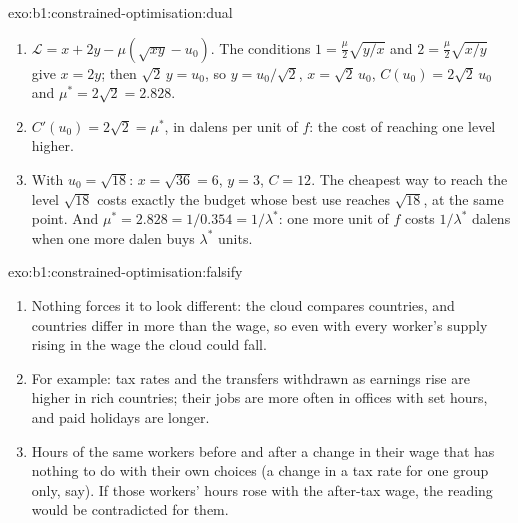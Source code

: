 \begin{solution}{exo:b1:constrained-optimisation:dual}
\begin{enumerate}
  \item $\mathcal L = x + 2y - \mu(\sqrt{xy} - u_0)$. The conditions
    $1 = \tfrac{\mu}{2}\sqrt{y/x}$ and $2 = \tfrac{\mu}{2}\sqrt{x/y}$ give
    $x = 2y$; then $\sqrt{2}\,y = u_0$, so $y = u_0/\sqrt 2$,
    $x = \sqrt 2\, u_0$, $C(u_0) = 2\sqrt 2\, u_0$ and $\mu^* = 2\sqrt 2 = 2.828$.
  \item $C'(u_0) = 2\sqrt2 = \mu^*$, in dalens per unit of $f$: the cost of
    reaching one level higher.
  \item With $u_0 = \sqrt{18}$: $x = \sqrt{36} = 6$, $y = 3$, $C = 12$. The
    cheapest way to reach the level $\sqrt{18}$ costs exactly the budget whose
    best use reaches $\sqrt{18}$, at the same point. And
    $\mu^* = 2.828 = 1/0.354 = 1/\lambda^*$: one more unit of $f$ costs $1/\lambda^*$
    dalens when one more dalen buys $\lambda^*$ units.
\end{enumerate}
\end{solution}

\begin{solution}{exo:b1:constrained-optimisation:falsify}
\begin{enumerate}
  \item Nothing forces it to look different: the cloud compares countries, and
    countries differ in more than the wage, so even with every worker's supply
    rising in the wage the cloud could fall.
  \item For example: tax rates and the transfers withdrawn as earnings rise
    are higher in rich countries; their jobs are more often in offices with
    set hours, and paid holidays are longer.
  \item Hours of the same workers before and after a change in their wage
    that has nothing to do with their own choices (a change in a tax rate
    for one group only, say). If those workers' hours rose with the after-tax
    wage, the reading would be contradicted for them.
\end{enumerate}
\end{solution}

